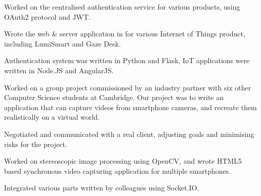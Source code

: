 \documentclass[]{deedy-resume-openfont}
\begin{document}
\begin{tightemize}
\item Worked on the centralised authentication service for various products, using OAuth2 protocol and JWT.
\item Wrote the web \& server application in for various Internet of Things product, including LumiSmart and Gaze Desk.
\item Authentication system was written in Python and Flask, IoT applications were written in Node.JS and AngularJS.
\end{tightemize}
\sectionsep

\vspace{\topsep} %
\begin{tightemize}
\item Worked on a group project commissioned by an industry partner with six other Computer Science students at Cambridge. Our project was to write an application that can capture videos from smartphone cameras, and recreate them realistically on a virtual world.
\item Negotiated and communicated with a real client, adjusting goals and minimising risks for the project.
\item Worked on stereoscopic image processing using OpenCV, and wrote HTML5 based synchronous video capturing application for multiple smartphones.
\item Integrated various parts written by colleagues using Socket.IO. 
\end{tightemize}
\sectionsep
\end{document}

